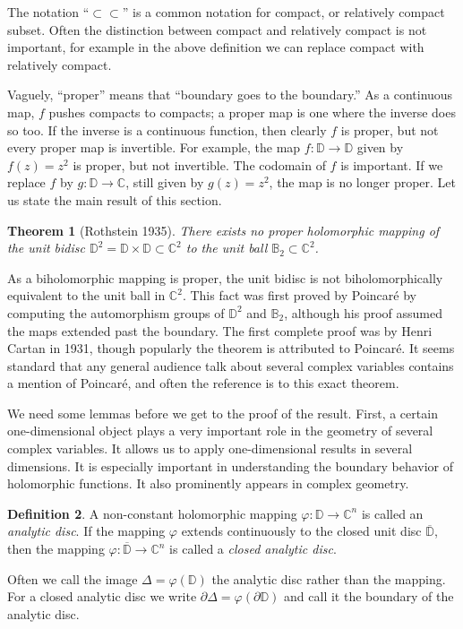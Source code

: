 \documentclass[12pt,openany]{book}
\newcommand{\C}{{\mathbb{C}}}
\newcommand{\D}{{\mathbb{D}}}
\newcommand{\bB}{{\mathbb{B}}}
\newcommand{\bD}{{\mathbb{D}}}
\newcommand{\myindex}[1]{#1\index{#1}}
\theoremstyle{plain}
\newtheorem{thm}{Theorem}[section]
\theoremstyle{remark}
\theoremstyle{definition}
\newtheorem{defn}[thm]{Definition}
\theoremstyle{exercise}
\theoremstyle{example}
\begin{document}
The notation ``$\subset \subset$'' is a common notation for compact, or relatively
compact subset.  Often the distinction between compact and relatively
compact is not important, for example in the above definition we can replace
compact with relatively compact.

Vaguely, ``proper'' means that ``boundary goes to the boundary.''
As a continuous map, $f$ pushes compacts to compacts; a proper map is
one where the inverse does so too.  If the inverse is a continuous
function, then clearly $f$ is proper,
but not every proper map is invertible.  For
example, the map $f \colon \D \to \D$ given by $f(z) = z^2$ is proper, but
not invertible.  The codomain of $f$ is important.  If we 
replace $f$ by $g \colon \D \to \C$, still given by $g(z)=z^2$, the map is
no longer proper.  Let us state the main result of this section.

\begin{thm}[Rothstein 1935] \label{thm:Rothstein}
There exists no proper holomorphic mapping of the unit bidisc $\D^2 = \bD \times \bD
\subset \C^2$ to the unit ball $\bB_2 \subset \C^2$.
\end{thm}

As a biholomorphic mapping is proper,
the unit bidisc is not biholomorphically
equivalent to the unit ball in $\C^2$.  This fact was first proved by
Poincar\'e by computing the automorphism groups of $\D^2$ and $\bB_2$,
although his proof
assumed the maps extended past the boundary.  The first
complete proof was by Henri Cartan in 1931, though popularly the theorem is
attributed to Poincar\'e.  It seems standard that any general audience talk
about several complex variables contains a mention of Poincar\'e,
and often the reference is to this exact theorem.

We need some lemmas before we get to the proof of the result.  First,
a certain one-dimensional object plays a very important role in the geometry
of several complex variables.  It allows us to apply one-dimensional
results in several dimensions.  It is especially important in
understanding the boundary behavior of holomorphic functions.  It also
prominently appears in complex geometry.

\begin{defn}
A non-constant holomorphic mapping
$\varphi \colon \D \to \C^n$ is called an \emph{\myindex{analytic disc}}.
If the mapping $\varphi$ extends continuously to the closed unit disc
$\overline{\D}$, then the mapping
$\varphi \colon \overline{\D} \to \C^n$ is called
a \emph{\myindex{closed analytic disc}}.

Often we call the image $\Delta = \varphi(\D)$ the analytic disc
rather than the mapping.  For a closed analytic disc we write
$\partial \Delta = \varphi( \partial \D)$ and call it the boundary
of the analytic disc.
\end{defn}
\end{document}
